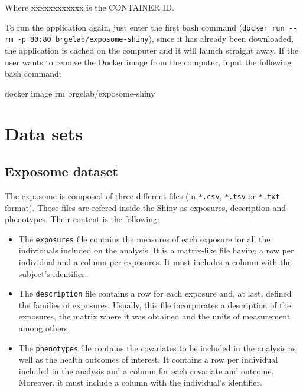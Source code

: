 \documentclass[
]{book}
\newenvironment{Shaded}{\begin{snugshade}}{\end{snugshade}}
\newcommand{\ExtensionTok}[1]{#1}
\newcommand{\NormalTok}[1]{#1}
\providecommand{\tightlist}{%
  \setlength{\itemsep}{0pt}\setlength{\parskip}{0pt}}
\begin{document}
Where xxxxxxxxxxxx is the CONTAINER ID.

To run the application again, just enter the first bash command (\texttt{docker\ run\ -\/-rm\ -p\ 80:80\ brgelab/exposome-shiny}), since it has already been downloaded, the application is cached on the computer and it will launch straight away. If the user wants to remove the Docker image from the computer, input the following bash command:

\begin{Shaded}
\begin{Highlighting}[]
\ExtensionTok{docker}\NormalTok{ image rm brgelab/exposome{-}shiny}
\end{Highlighting}
\end{Shaded}

\hypertarget{data-sets}{%
\chapter{Data sets}\label{data-sets}}

\hypertarget{expo_data}{%
\section{Exposome dataset}\label{expo_data}}

The exposome is composed of three different files (in \texttt{*.csv}, \texttt{*.tsv} or \texttt{*.txt} format). Those files are refered inside the Shiny as exposures, description and phenotypes. Their content is the following:

\begin{itemize}
\tightlist
\item
  The \texttt{exposures} file contains the measures of each exposure for all the individuals included on the analysis. It is a matrix-like file having a row per individual and a column per exposures. It must includes a column with the subject's identifier.
\item
  The \texttt{description} file contains a row for each exposure and, at last, defined the families of exposures. Usually, this file incorporates a description of the exposures, the matrix where it was obtained and the units of measurement among others.
\item
  The \texttt{phenotypes} file contains the covariates to be included in the analysis as well as the health outcomes of interest. It contains a row per individual included in the analysis and a column for each covariate and outcome. Moreover, it must include a column with the individual's identifier.
\end{itemize}
\end{document}

